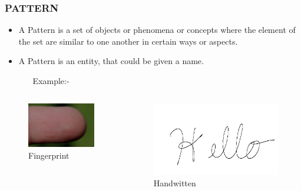 \documentclass{beamer}
\begin{document}
\begin{frame}
\transblindsvertical
\frametitle{PATTERN}
\begin{itemize}
\item {} A Pattern is a set of objects or phenomena or concepts where the element of the set are similar to one another in certain ways or aspects. %
\item {} A Pattern is an entity, that could be given a name.  %
\begin{itemize}
\vspace{1cm}\item[Example:-] 
\end{itemize}
\end{itemize}
\begin{columns}
\begin{column}{.3\textwidth}
\begin{figure}
\includegraphics[width=\textwidth]{finger.jpg} 
\caption {Fingerprint}
\end{figure}

\end{column}
\begin{column}{.3\textwidth}
\begin{figure}
\includegraphics[width=\textwidth]{hand.jpg}
\caption {Handwitten}
\end{figure}
\end{column}


\end{columns}
\end{frame}
\end{document}
